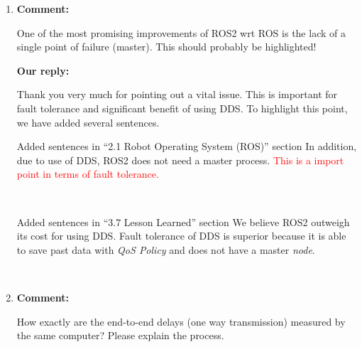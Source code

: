 \documentclass{article}
\begin{document}
\begin{enumerate}
\item \begin{flushleft}
  \textbf{Comment:}
\end{flushleft}
  One of the most promising improvements of ROS2 wrt ROS is the lack of a single point of failure (master). This should probably be highlighted!

  \begin{flushleft}
    \textbf{Our reply:}
  \end{flushleft}
  Thank you very much for pointing out a vital issue.
  This is important for fault tolerance and significant benefit of using DDS.
  To highlight this point, we have added several sentences.
  \begin{itembox}[|]{Added sentences in ``2.1 Robot Operating System (ROS)'' section}
    In addition, due to use of DDS, ROS2 does not need a master process.
    \textcolor{red}{This is a import point in terms of fault tolerance.}
  \end{itembox}\\
  \begin{itembox}[|]{Added sentences in ``3.7 Lesson Learned'' section}
    We believe ROS2 outweigh its cost for using DDS.
    Fault tolerance of DDS is superior because it is able to save past data with \emph{QoS Policy} and does not have a master \emph{node}.
  \end{itembox}\\
  
\item \begin{flushleft}
  \textbf{Comment:}
\end{flushleft}
  How exactly are the end-to-end delays (one way transmission) measured by the same computer? Please explain the process.


\end{enumerate}
\end{document}
